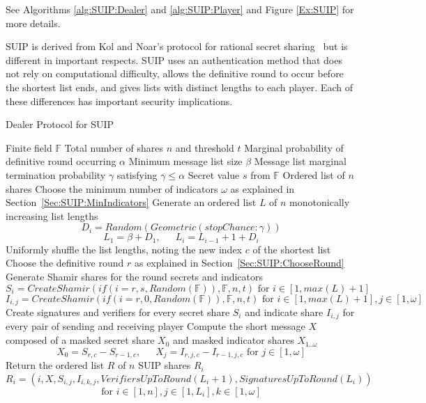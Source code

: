 \documentclass[12pt]{dalcsthesis}
\begin{document}
See Algorithms \ref{alg:SUIP:Dealer} and \ref{alg:SUIP:Player} and Figure \ref{Ex:SUIP} for more details.

SUIP is derived from Kol and Noar's protocol for rational secret sharing~\cite{kol08} but is different in important respects. SUIP uses an authentication method that does not rely on computational difficulty, allows the definitive round to occur before the shortest list ends, and gives lists with distinct lengths to each player. Each of these differences has important security implications.

\begin{algorithm}
  \caption{Dealer Protocol for SUIP}
  \label{alg:SUIP:Dealer}
  \begin{algorithmic}
    \INPUT Finite field $\mathbb{F}$
    \INPUT Total number of shares $n$ and threshold $t$
    \INPUT Marginal probability of definitive round occurring $\alpha$
    \INPUT Minimum message list size $\beta$
    \INPUT Message list marginal termination probability $\gamma$ satisfying $\gamma \leq \alpha$
    \INPUT Secret value $s$ from $\mathbb{F}$
    \OUTPUT Ordered list of $n$ shares
    \STATE Choose the minimum number of indicators $\omega$ as explained in Section~\ref{Sec:SUIP:MinIndicators}
    \STATE Generate an ordered list $L$ of $n$ monotonically increasing list lengths
    	$$D_i = Random(Geometric(stopChance: \gamma))$$
    	$$L_1 = \beta + D_1 \text{, } \text{ } \text{ } L_i = L_{i-1} + 1 + D_i$$
    \STATE Uniformly shuffle the list lengths, noting the new index $c$ of the shortest list
    \STATE Choose the definitive round $r$ as explained in Section~\ref{Sec:SUIP:ChooseRound}
    \STATE Generate Shamir shares for the round secrets and indicators
    	$$S_{i} = CreateShamir(if(i = r, s, Random(\mathbb{F})), \mathbb{F}, n, t) \text{ for } i \in [1, max(L)+1]$$
    	$$I_{i,j} = CreateShamir(if(i = r, 0, Random(\mathbb{F})), \mathbb{F}, n, t) \text{ for } i \in [1, max(L)+1], j \in [1, \omega]$$
    \STATE Create signatures and verifiers for every secret share $S_i$ and indicate share $I_{i,j}$ for every pair of sending and receiving player
    \STATE Compute the short message $X$ composed of a masked secret share $X_0$ and masked indicator shares $X_{1..\omega}$
    	$$X_0 = S_{r,c} - S_{r-1,c} \text{, } \text{ } \text{ } X_j = I_{r,j,c} - I_{r-1,j,c} \text{ for } j \in [1, \omega]$$
    \STATE Return the ordered list $R$ of $n$ SUIP shares $R_i$
    	$$R_i = (i, X, S_{i,j}, I_{i,k,j}, VerifiersUpToRound(L_i+1), SignaturesUpToRound(L_i))$$
    	$$\text{for } i \in [1, n], j \in [1, L_i], k \in [1, \omega]$$
  \end{algorithmic}
\end{algorithm}
\end{document}
